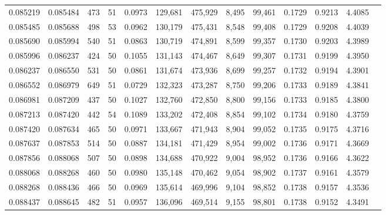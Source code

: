 \begin{tabular}{rrrrrrrrrrrrr}
0.085219 & 0.085484 &   473 &  51 &                                     0.0973 & 129,681 & 475,929 &   8,495 &  99,461 & 0.1729 & 0.9213 & 4.4085 \\
0.085485 & 0.085688 &   498 &  53 &                                     0.0962 & 130,179 & 475,431 &   8,548 &  99,408 & 0.1729 & 0.9208 & 4.4039 \\
0.085690 & 0.085994 &   540 &  51 &                                     0.0863 & 130,719 & 474,891 &   8,599 &  99,357 & 0.1730 & 0.9203 & 4.3989 \\
0.085996 & 0.086237 &   424 &  50 &                                     0.1055 & 131,143 & 474,467 &   8,649 &  99,307 & 0.1731 & 0.9199 & 4.3950 \\
0.086237 & 0.086550 &   531 &  50 &                                     0.0861 & 131,674 & 473,936 &   8,699 &  99,257 & 0.1732 & 0.9194 & 4.3901 \\
0.086552 & 0.086979 &   649 &  51 &                                     0.0729 & 132,323 & 473,287 &   8,750 &  99,206 & 0.1733 & 0.9189 & 4.3841 \\
0.086981 & 0.087209 &   437 &  50 &                                     0.1027 & 132,760 & 472,850 &   8,800 &  99,156 & 0.1733 & 0.9185 & 4.3800 \\
0.087213 & 0.087420 &   442 &  54 &                                     0.1089 & 133,202 & 472,408 &   8,854 &  99,102 & 0.1734 & 0.9180 & 4.3759 \\
0.087420 & 0.087634 &   465 &  50 &                                     0.0971 & 133,667 & 471,943 &   8,904 &  99,052 & 0.1735 & 0.9175 & 4.3716 \\
0.087637 & 0.087853 &   514 &  50 &                                     0.0887 & 134,181 & 471,429 &   8,954 &  99,002 & 0.1736 & 0.9171 & 4.3669 \\
0.087856 & 0.088068 &   507 &  50 &                                     0.0898 & 134,688 & 470,922 &   9,004 &  98,952 & 0.1736 & 0.9166 & 4.3622 \\
0.088068 & 0.088268 &   460 &  50 &                                     0.0980 & 135,148 & 470,462 &   9,054 &  98,902 & 0.1737 & 0.9161 & 4.3579 \\
0.088268 & 0.088436 &   466 &  50 &                                     0.0969 & 135,614 & 469,996 &   9,104 &  98,852 & 0.1738 & 0.9157 & 4.3536 \\
0.088437 & 0.088645 &   482 &  51 &                                     0.0957 & 136,096 & 469,514 &   9,155 &  98,801 & 0.1738 & 0.9152 & 4.3491 \\

\end{tabular}
